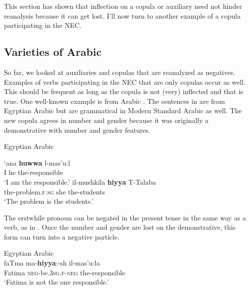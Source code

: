 \documentclass[output=paper,draft,draftmode,colorlinks,citecolor=brown]{langscibook}
\begin{document}
This section has shown that inflection on a copula or auxiliary need not hinder reanalysis because it can get lost. I'll now turn to another example of a copula participating in the NEC.

\subsection{Varieties of Arabic}\label{sec:oth-2.3}

So far, we looked at auxiliaries and copulas that are reanalyzed as
negatives. Examples of verbs participating in the NEC that are only copulas
occur as well. This should be frequent as long as the copula is not (very)
inflected and that is true. One well-known example is from Arabic
\parencites{Eid1983}{Katz1996}{Edwards2006}{Alsaeedi2015}.  The sentences in
 are from Egyptian Arabic but are
grammatical in Modern Standard Arabic as well. The new copula agrees in
number and gender because it was originally a demonstrative with number and
gender features.
\newpage

\begin{exe}\ex Egyptian Arabic
\label{ex:other-arabic-responsible-students}
    \begin{xlist}
    \ex \label{ex:other-arabic-responsible}
    \gll `ana \textbf{huwwa}    l-mas'u:l       \\
    I  he    the-responsible \\
    \glt `I am the responsible.' \citep[51]{Edwards2006}
    \ex \label{ex:other-arabic-students}
    \gll il-mushkila     \textbf{hiyya}   T-Talaba\\    
    the-problem.\textsc{f.sg}   she  the-students \\
    \glt `The problem is the students.' \citep[52]{Edwards2006}
    \end{xlist}\end{exe}
%
The erstwhile pronoun can be negated in the present tense in the same way
as a verb, as in . Once the number and gender are lost on the demonstrative, this form can turn into a negative particle.
%
\begin{exe}\ex Egyptian Arabic \label{ex:other-arabic-Fatima}\\
    \gll faTma ma-\textbf{hiyya}:-sh il-mas'u:la \\
    Fatima \textsc{neg}-be.\textsc{3sg.f-neg}   the-responsible \\
    \glt `Fatima is not the one responsible.' \citep[53]{Edwards2006}
    \end{exe}
\end{document}
